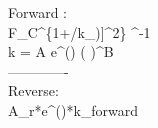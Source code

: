 \mbox{Forward} :\\
F_C^{\{1+\left[\log_{10}(k_0[\mbox{\footnotesize M}]/k_{\infty})\right]^2\} ^{-1}} \\
k = A  e^{()} \left(  \right)^{B} \\ 
-------------\\
\mbox{Reverse}: \\
A_r*e^{\left(\right)}*k_{\mbox{forward}}   
